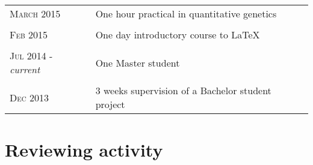 \documentclass[a4paper,oneside,10pt]{article} %
\begin{document}
\subsection*{}
\begin{tabular}{p{4cm}|p{11cm}}
\hfill \textsc{March 2015} & One hour practical in quantitative genetics\\
\multicolumn{2}{c}{} \\
\hfill \textsc{Feb 2015} & One day introductory course to \LaTeX\\
\multicolumn{2}{c}{} \\
\hfill \textsc{Jul 2014 -} \emph{current} & One Master student\\
\multicolumn{2}{c}{} \\
\hfill \textsc{Dec 2013} & 3 weeks supervision of a Bachelor student project\\
\end{tabular}

\section*{Reviewing activity}
\end{document}
